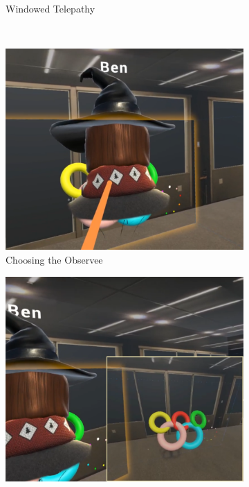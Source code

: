 \documentclass[chi_draft]{sigchi}
\begin{document}
\begin{figure}
\begin{subfigure}[b]{0.4\columnwidth}
        \caption{Windowed Telepathy}
        \label{fig:observeW}
    \end{subfigure}
    ~ %
    \begin{subfigure}[b]{0.4\columnwidth}
        \includegraphics[width=1\columnwidth]{observe1.png}
        \caption{Choosing the Observee}
        \label{fig:observe1}
    \end{subfigure}
    \begin{subfigure}[b]{0.4\columnwidth}
        \includegraphics[width=1\columnwidth]{observe2.png}

\end{subfigure}
\end{figure}
\end{document}
